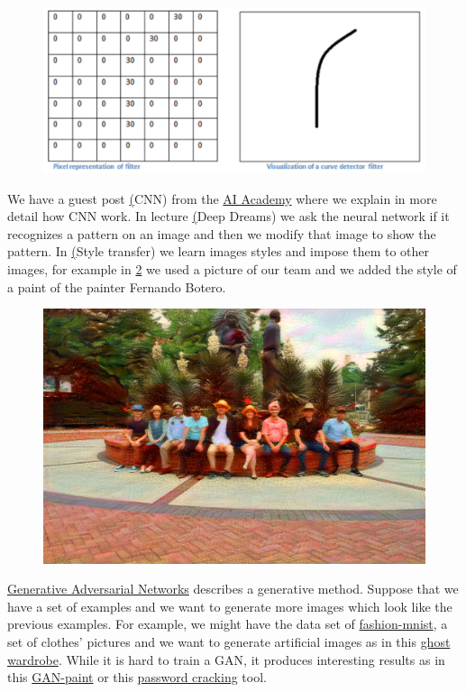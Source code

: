 \documentclass[11pt,letterpaper]{report}
\begin{document}
	\begin{figure}[h!]
		\centering
		\includegraphics[width=0.45\linewidth]{figures/filter.png}
		\caption{}
		\label{fig:filter}
	\end{figure} 	

    We have a guest post \href{ http://nbviewer.jupyter.org/mendozacortesgroup/machine_learning_class/blob/master/Lectures_Jupyter/L9_CNN/CNN.ipynb} (CNN) from the \href{https://aiacademy.tw}{AI Academy}\cite{wai} where
	 we explain in more detail how CNN work. In lecture \href{ http://nbviewer.jupyter.org/mendozacortesgroup/machine_learning_class/blob/master/Lectures_Jupyter/L18_DeepDreams/DeepDream.ipynb} (Deep Dreams) we ask the neural network if it recognizes a pattern on an image and then we modify that image to show the pattern. In \href{ http://nbviewer.jupyter.org/mendozacortesgroup/machine_learning_class/blob/master/Lectures_Jupyter/L19_StyleTransfer/Art_Machine_Learning.ipynb} (Style transfer)  we learn images styles and impose them to other images, for example  in \ref{fig:botero} we used a picture of our team and we added the style of a paint of the painter Fernando Botero. %
	
	
	\begin{figure}[h!]
		\centering
		\includegraphics[width=0.45\linewidth]{figures/botero.png}
		\caption{}
		\label{fig:botero}
	\end{figure} 	
	
	
	\href{ http://nbviewer.jupyter.org/mendozacortesgroup/machine_learning_class/blob/master/Lectures_Jupyter/L22_GAN/Generative\%20Adversarial\%20Networks.ipynb} {Generative Adversarial Networks}  describes a generative method. Suppose that we have a set of examples and we want to generate more images which look like the previous examples. For example, we might have the data set of
	\href{https://github.com/zalandoresearch/fashion-mnist}{fashion-mnist}\cite{wfashion}, a set of  clothes' pictures and we want to generate artificial images as in this \href{https://github.com/spaceLenny/FashionDCGANExample}{ghost wardrobe}\cite{wghost}. While it is hard to train a GAN, it produces interesting results as in this \href{ https://twitter.com/henddkn/status/1067431379804262400?s=19 } {GAN-paint}\cite{wtwitter} or this 
	\href{    https://towardsdatascience.com/password-cracker-generating-passwords-with-recurrent-neural-networks-lstms-9583714a3310 
	}{password cracking}\cite{wpassword} tool.
	
\end{document}
